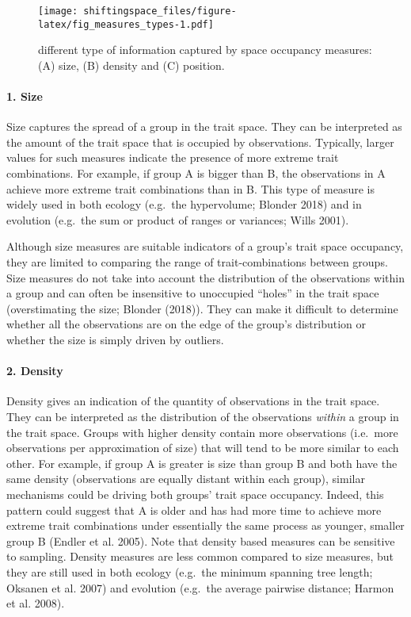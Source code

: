 \documentclass[]{article}
\let\oldparagraph\paragraph
\renewcommand{\paragraph}[1]{\oldparagraph{#1}\mbox{}}
\begin{document}
\renewcommand\baselinestretch{1}\selectfont

\begin{figure}
\centering
\texttt{[image: shiftingspace\_files/figure-latex/fig\_measures\_types-1.pdf]}
\caption{different type of information captured by space occupancy
measures: (A) size, (B) density and (C) position.}
\end{figure}

\renewcommand\baselinestretch{1.6}\selectfont

\paragraph{1. Size}\label{size}

Size captures the spread of a group in the trait space. They can be
interpreted as the amount of the trait space that is occupied by
observations. Typically, larger values for such measures indicate the
presence of more extreme trait combinations. For example, if group A is
bigger than B, the observations in A achieve more extreme trait
combinations than in B. This type of measure is widely used in both
ecology (e.g.~the hypervolume; Blonder 2018) and in evolution (e.g.~the
sum or product of ranges or variances; Wills 2001).

Although size measures are suitable indicators of a group's trait space
occupancy, they are limited to comparing the range of trait-combinations
between groups. Size measures do not take into account the distribution
of the observations within a group and can often be insensitive to
unoccupied ``holes'' in the trait space (overstimating the size; Blonder
(2018)). They can make it difficult to determine whether all the
observations are on the edge of the group's distribution or whether the
size is simply driven by outliers.

\paragraph{2. Density}\label{density}

Density gives an indication of the quantity of observations in the trait
space. They can be interpreted as the distribution of the observations
\emph{within} a group in the trait space. Groups with higher density
contain more observations (i.e.~more observations per approximation of
size) that will tend to be more similar to each other. For example, if
group A is greater is size than group B and both have the same density
(observations are equally distant within each group), similar mechanisms
could be driving both groups' trait space occupancy. Indeed, this
pattern could suggest that A is older and has had more time to achieve
more extreme trait combinations under essentially the same process as
younger, smaller group B (Endler et al. 2005). Note that density based
measures can be sensitive to sampling. Density measures are less common
compared to size measures, but they are still used in both ecology
(e.g.~the minimum spanning tree length; Oksanen et al. 2007) and
evolution (e.g.~the average pairwise distance; Harmon et al. 2008).
\end{document}
